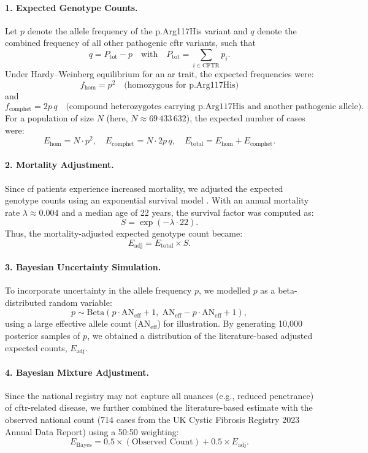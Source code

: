 \paragraph{1. Expected Genotype Counts.}
Let \( p \) denote the allele frequency of the p.Arg117His variant and \( q \) denote the combined frequency of all other pathogenic \ac{cftr} variants, such that
\[
q = P_{\text{tot}} - p \quad \text{with} \quad P_{\text{tot}} = \sum_{i \in \text{CFTR}} p_i.
\]
Under Hardy–Weinberg equilibrium for an \ac{ar} trait, the expected frequencies were:
\[
f_{\text{hom}} = p^2 \quad \text{(homozygous for p.Arg117His)}
\]
and
\[
f_{\text{comphet}} = 2p\,q \quad \text{(compound heterozygotes carrying p.Arg117His and another pathogenic allele)}.
\]
For a population of size \( N \) (here, \( N \approx 69\,433\,632 \)), the expected number of cases were:
\[
E_{\text{hom}} = N \cdot p^2,\quad E_{\text{comphet}} = N \cdot 2p\,q,\quad E_{\text{total}} = E_{\text{hom}} + E_{\text{comphet}}.
\]

\paragraph{2. Mortality Adjustment.}
Since \ac{cf} patients experience increased mortality, we adjusted the expected genotype counts using an exponential survival model \cite{naito2023uk, castellani2013cftr2, Grasemann2023cftr}. With an annual mortality rate \(\lambda \approx 0.004\) and a median age of 22 years, the survival factor was computed as:
\[
S = \exp(-\lambda \cdot 22).
\]
Thus, the mortality-adjusted expected genotype count became:
\[
E_{\text{adj}} = E_{\text{total}} \times S.
\]

\paragraph{3. Bayesian Uncertainty Simulation.}
To incorporate uncertainty in the allele frequency \( p \), we modelled \( p \) as a beta-distributed random variable:
\[
p \sim \mathrm{Beta}(p \cdot \text{AN}_{\text{eff}} + 1,\; \text{AN}_{\text{eff}} - p \cdot \text{AN}_{\text{eff}} + 1),
\]
using a large effective allele count (\(\text{AN}_{\text{eff}}\)) for illustration. By generating 10,000 posterior samples of \( p \), we obtained a distribution of the literature-based adjusted expected counts, \(E_{\text{adj}}\).

\paragraph{4. Bayesian Mixture Adjustment.}
Since the national registry may not capture all nuances (e.g., reduced penetrance) of \ac{cftr}-related disease, we further combined the literature-based estimate with the observed national count (714 cases from the UK Cystic Fibrosis Registry 2023 Annual Data Report) using a 50:50 weighting:
\[
E_{\text{Bayes}} = 0.5 \times (\text{Observed Count}) + 0.5 \times E_{\text{adj}}.
\]

